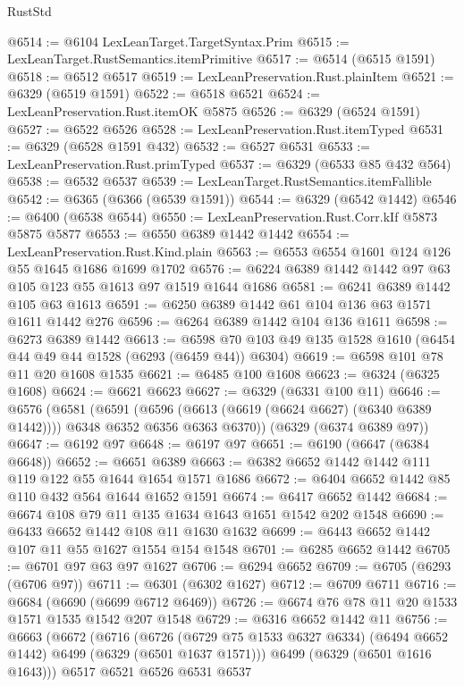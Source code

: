 \begin{lexlean}{RustStd}
\begin{coremodule}
{{@6514 := @6104 LexLeanTarget.TargetSyntax.Prim
@6515 := LexLeanTarget.RustSemantics.itemPrimitive
@6517 := @6514 (@6515 @1591)
@6518 := @6512 @6517
@6519 := LexLeanPreservation.Rust.plainItem
@6521 := @6329 (@6519 @1591)
@6522 := @6518 @6521
@6524 := LexLeanPreservation.Rust.itemOK @5875
@6526 := @6329 (@6524 @1591)
@6527 := @6522 @6526
@6528 := LexLeanPreservation.Rust.itemTyped
@6531 := @6329 (@6528 @1591 @432)
@6532 := @6527 @6531
@6533 := LexLeanPreservation.Rust.primTyped
@6537 := @6329 (@6533 @85 @432 @564)
@6538 := @6532 @6537
@6539 := LexLeanTarget.RustSemantics.itemFallible
@6542 := @6365 (@6366 (@6539 @1591))
@6544 := @6329 (@6542 @1442)
@6546 := @6400 (@6538 @6544)
@6550 := LexLeanPreservation.Rust.Corr.kIf @5873 @5875 @5877
@6553 := @6550 @6389 @1442 @1442
@6554 := LexLeanPreservation.Rust.Kind.plain
@6563 := @6553 @6554 @1601 @124 @126 @55 @1645 @1686 @1699 @1702
@6576 := @6224 @6389 @1442 @1442 @97 @63 @105 @123 @55 @1613 @97 @1519 @1644 @1686
@6581 := @6241 @6389 @1442 @105 @63 @1613
@6591 := @6250 @6389 @1442 @61 @104 @136 @63 @1571 @1611 @1442 @276
@6596 := @6264 @6389 @1442 @104 @136 @1611
@6598 := @6273 @6389 @1442
@6613 := @6598 @70 @103 @49 @135 @1528 @1610 (@6454 @44 @49 @44 @1528 (@6293 (@6459 @44)) @6304)
@6619 := @6598 @101 @78 @11 @20 @1608 @1535
@6621 := @6485 @100 @1608
@6623 := @6324 (@6325 @1608)
@6624 := @6621 @6623
@6627 := @6329 (@6331 @100 @11)
@6646 := @6576
    (@6581
      (@6591
        (@6596 (@6613 (@6619 (@6624 @6627) (@6340 @6389 @1442))))
        @6348
        @6352
        @6356
        @6363
        @6370))
    (@6329 (@6374 @6389 @97))
@6647 := @6192 @97
@6648 := @6197 @97
@6651 := @6190 (@6647 (@6384 @6648))
@6652 := @6651 @6389
@6663 := @6382 @6652 @1442 @1442 @111 @119 @122 @55 @1644 @1654 @1571 @1686
@6672 := @6404 @6652 @1442 @85 @110 @432 @564 @1644 @1652 @1591
@6674 := @6417 @6652 @1442
@6684 := @6674 @108 @79 @11 @135 @1634 @1643 @1651 @1542 @202 @1548
@6690 := @6433 @6652 @1442 @108 @11 @1630 @1632
@6699 := @6443 @6652 @1442 @107 @11 @55 @1627 @1554 @154 @1548
@6701 := @6285 @6652 @1442
@6705 := @6701 @97 @63 @97 @1627
@6706 := @6294 @6652
@6709 := @6705 (@6293 (@6706 @97))
@6711 := @6301 (@6302 @1627)
@6712 := @6709 @6711
@6716 := @6684 (@6690 (@6699 @6712 @6469))
@6726 := @6674 @76 @78 @11 @20 @1533 @1571 @1535 @1542 @207 @1548
@6729 := @6316 @6652 @1442 @11
@6756 := @6663
    (@6672
      (@6716
        (@6726 (@6729 @75 @1533 @6327 @6334) (@6494 @6652 @1442) @6499 (@6329 (@6501 @1637 @1571)))
        @6499
        (@6329 (@6501 @1616 @1643)))
      @6517
      @6521
      @6526
      @6531
      @6537
}}
\end{coremodule}
\end{lexlean}
